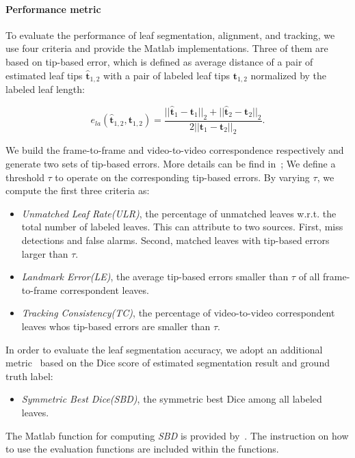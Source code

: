 \paragraph{Performance metric}
To evaluate the performance of leaf segmentation, alignment, and tracking, we use four criteria and provide the Matlab implementations.
Three of them are based on tip-based error, which is defined as average distance of a pair of estimated leaf tips $\hat{\bm{t}}_{1,2}$ with a pair of labeled leaf tips $ \bm{t}_{1,2}$ normalized by the labeled leaf length:

\begin {equation}
e_{la}(\hat{\bm{t}}_{1,2}, \bm{t}_{1,2}) = \frac{||\hat{\bm{t}}_1-{\bm{t}}_1||_2 + ||\hat{\bm{t}}_2-{\bm{t}}_2||_2}{2 ||\bm{t}_1-\bm{t}_2||_2}.
\label{eqn:tipError}
\end{equation}

We build the frame-to-frame and video-to-video correspondence respectively and generate two sets of tip-based errors.
More details can be find in~\cite{};
We define a threshold $\tau$ to operate on the corresponding tip-based errors.
By varying $\tau$, we compute the first three criteria as:
\begin{itemize}
  \item {\it{Unmatched Leaf Rate(ULR)}}, the percentage of unmatched leaves w.r.t. the total number of labeled leaves. This can attribute to two sources. First, miss detections and false alarms. Second, matched leaves with tip-based errors larger than $\tau$.
  \item {\it{Landmark Error(LE)}}, the average tip-based errors smaller than $\tau$ of all frame-to-frame correspondent leaves.
  \item {\it{Tracking Consistency(TC)}}, the percentage of video-to-video correspondent leaves whos tip-based errors are smaller than $\tau$.
\end{itemize}

In order to evaluate the leaf segmentation accuracy, we adopt an additional metric~\cite{scharr2014annotated} based on the Dice score of estimated segmentation result and ground truth label:
\begin{itemize}
  \item {\it{Symmetric Best Dice(SBD)}}, the symmetric best Dice among all labeled leaves.
\end{itemize}

The Matlab function for computing {\it{SBD}} is provided by~\cite{scharr2014annotated}.
The instruction on how to use the evaluation functions are included within the functions.


